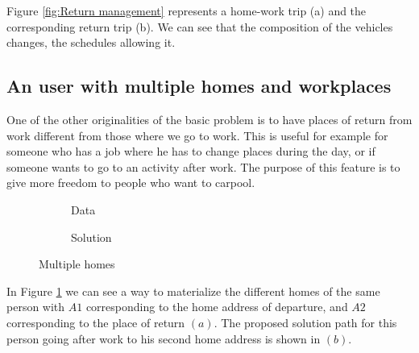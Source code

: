 \documentclass[12pt, a4paper, twoside]{memoir}
\begin{document}
{	Figure \ref{fig:Return management} represents a home-work trip (a) and the corresponding return trip (b). We can see that the composition of the vehicles changes, the schedules allowing it.
	
	\subsection*{An user with multiple homes and workplaces}
	One of the other originalities of the basic problem is to have places of return from work different from those where we go to work. This is useful for example for someone who has a job where he has to change places during the day, or if someone wants to go to an activity after work. The purpose of this feature is to give more freedom to people who want to carpool.
	
	\begin{figure}[H]
		\centering
		\begin{subfigure}{.5\textwidth}
			\centering
			\caption{ Data }
		\end{subfigure}%
		\begin{subfigure}{.5\textwidth}
			\centering
			\caption{ Solution }
		\end{subfigure}
		\caption{Multiple homes}
		\label{fig:Several homes}
	\end{figure}
	
	In Figure \ref{fig:Several homes} we can see a way to materialize the different homes of the same person with $A1$ corresponding to the home address of departure, and $A2$ corresponding to the place of return $(a)$. The proposed solution path for this person going after work to his second home address is shown in $(b)$.
	
}
\end{document}
